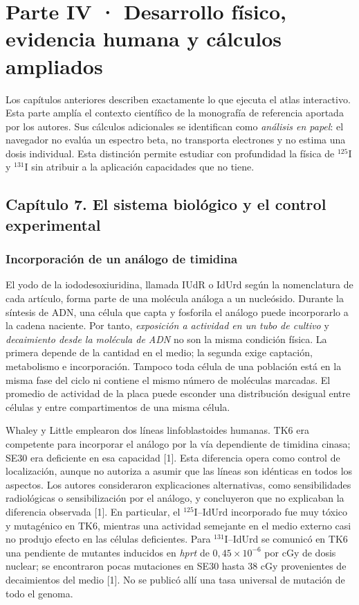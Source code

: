 \clearpage
\section{Parte IV · Desarrollo físico, evidencia humana y cálculos ampliados}
\label{parte-ampliada}

Los capítulos anteriores describen exactamente lo que ejecuta el atlas interactivo.
Esta parte amplía el contexto científico de la monografía de referencia aportada por
los autores. Sus cálculos adicionales se identifican como \emph{análisis en papel}:
el navegador no evalúa un espectro beta, no transporta electrones y no estima una
dosis individual. Esta distinción permite estudiar con profundidad la física de
$^{125}$I y $^{131}$I sin atribuir a la aplicación capacidades que no tiene.

\subsection{Capítulo 7. El sistema biológico y el control experimental}
\label{ampliacion-sistema}

\subsubsection{Incorporación de un análogo de timidina}
El yodo de la iododesoxiuridina, llamada IUdR o IdUrd según la nomenclatura de
cada artículo, forma parte de una molécula análoga a un nucleósido. Durante la
síntesis de ADN, una célula que capta y fosforila el análogo puede incorporarlo
a la cadena naciente. Por tanto, \emph{exposición a actividad en un tubo de cultivo}
y \emph{decaimiento desde la molécula de ADN} no son la misma condición física.
La primera depende de la cantidad en el medio; la segunda exige captación,
metabolismo e incorporación. Tampoco toda célula de una población está en la
misma fase del ciclo ni contiene el mismo número de moléculas marcadas. El
promedio de actividad de la placa puede esconder una distribución desigual entre
células y entre compartimentos de una misma célula.

Whaley y Little emplearon dos líneas linfoblastoides humanas. TK6 era competente
para incorporar el análogo por la vía dependiente de timidina cinasa; SE30 era
deficiente en esa capacidad [1]. Esta diferencia opera como control de
localización, aunque no autoriza a asumir que las líneas son idénticas en todos
los aspectos. Los autores consideraron explicaciones alternativas, como
sensibilidades radiológicas o sensibilización por el análogo, y concluyeron que
no explicaban la diferencia observada [1]. En particular, el $^{125}$I--IdUrd
incorporado fue muy tóxico y mutagénico en TK6, mientras una actividad semejante
en el medio externo casi no produjo efecto en las células deficientes. Para
$^{131}$I--IdUrd se comunicó en TK6 una pendiente de mutantes inducidos en
\emph{hprt} de $0,45\times10^{-6}$ por cGy de dosis nuclear; se encontraron
pocas mutaciones en SE30 hasta 38 cGy provenientes de decaimientos del medio
[1]. No se publicó allí una tasa universal de mutación de todo el genoma.

